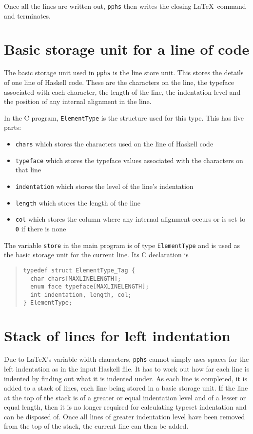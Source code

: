 Once all the lines are written out, {\tt pphs} then writes the closing \LaTeX\ command
and terminates.

\section{Basic storage unit for a line of code} \label{line-store}

The basic storage unit used in {\tt pphs} is the line store unit.
This stores the details of one line of Haskell code.  These are
the characters on the line, the typeface associated with each
character, the length of the line, the indentation level and the position of
any internal alignment in the line.

In the C program, {\tt ElementType} is the structure used for this type.  This has
five parts:
\begin{itemize}
\item {\tt chars} which stores the characters used on the line of Haskell
code

\item {\tt typeface} which stores the typeface values associated with the
characters on that line

\item {\tt indentation} which stores the level of the line's indentation

\item {\tt length} which stores the length of the line

\item {\tt col} which stores the column where any internal alignment occurs or
is set to {\tt 0} if there is none
\end{itemize}
The variable {\tt store} in the main program is of type {\tt ElementType} and
is used as the basic storage unit for the current line.  Its C declaration is
\begin{quote}
\begin{verbatim}
typedef struct ElementType_Tag {
  char chars[MAXLINELENGTH];
  enum face typeface[MAXLINELENGTH];
  int indentation, length, col;
} ElementType;
\end{verbatim}
\end{quote}

\section{Stack of lines for left indentation}

Due to \LaTeX 's variable width characters, {\tt pphs} cannot simply uses spaces
for the left indentation as in the input Haskell file.  It has to work out how far
each line is indented by finding out what it is indented under.  As each line is
completed, it is added to a stack of lines, each line being stored in a basic
storage unit.  If the line at the top of the stack is of a greater or equal
indentation level and of a lesser or equal length, then it is no
longer required for calculating typeset indentation
and can be disposed of.  Once all lines of greater indentation level have been removed
from the top of the stack, the current line can then be added.

